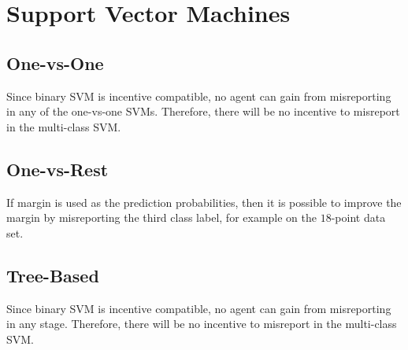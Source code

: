 \documentclass{article}
\begin{document}
\section{Support Vector Machines} 

\subsection{One-vs-One}
Since binary SVM is incentive compatible, no agent can gain from misreporting in any of the one-vs-one SVMs. Therefore, there will be no incentive to misreport in the multi-class SVM.
\newline \newline


\subsection{One-vs-Rest}
If margin is used as the prediction probabilities, then it is possible to improve the margin by misreporting the third class label, for example on the $18$-point data set.
\newline \newline


\subsection{Tree-Based}
Since binary SVM is incentive compatible, no agent can gain from misreporting in any stage. Therefore, there will be no incentive to misreport in the multi-class SVM.
\newline \newline


\end{document}
